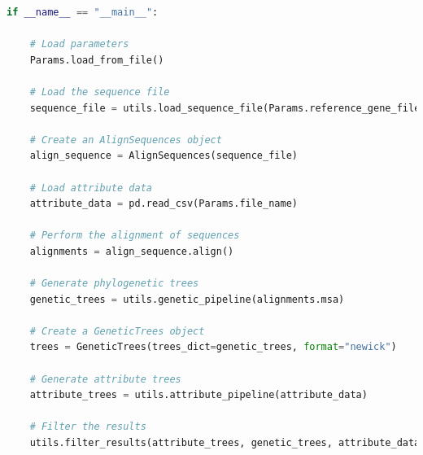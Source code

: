 \begin{lstlisting}[label=lst:main,language=Python,caption=Main script for tutorial using the aPhyloGeo package.]
if __name__ == "__main__":

    # Load parameters
    Params.load_from_file()

    # Load the sequence file
    sequence_file = utils.load_sequence_file(Params.reference_gene_filepath)

    # Create an AlignSequences object
    align_sequence = AlignSequences(sequence_file)

    # Load attribute data 
    attribute_data = pd.read_csv(Params.file_name)

    # Perform the alignment of sequences
    alignments = align_sequence.align()

    # Generate phylogenetic trees
    genetic_trees = utils.genetic_pipeline(alignments.msa)
    
    # Create a GeneticTrees object
    trees = GeneticTrees(trees_dict=genetic_trees, format="newick")
   
    # Generate attribute trees
    attribute_trees = utils.attribute_pipeline(attribute_data)
    
    # Filter the results
    utils.filter_results(attribute_trees, genetic_trees, attribute_data)
\end{lstlisting}

